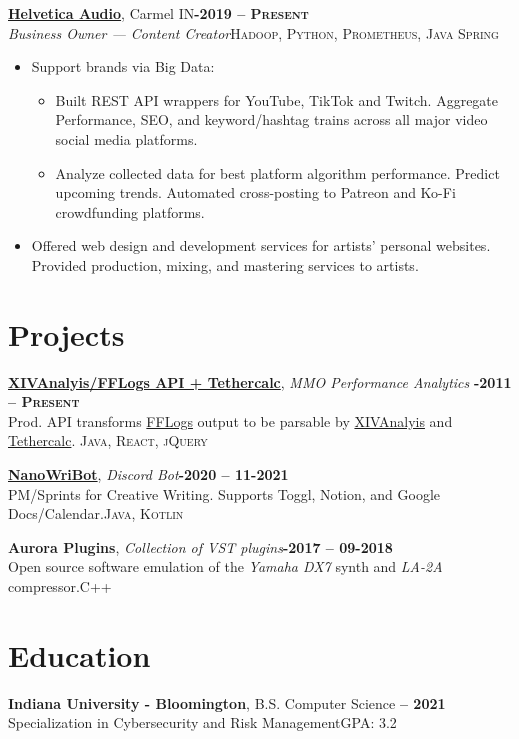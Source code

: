 \documentclass[margin,10pt]{res}
\begin{document}
\begin{resume}
    \href{}{\textbf{Helvetica Audio}}, Carmel IN\hfill \textsc{\bfseries{}-2019 -- Present}\\
    \textit{Business Owner --- Content Creator}\hfill \textsc{Hadoop, Python, Prometheus, Java Spring}
    \vspace{0.5em}
    \begin{itemize}
        \item Support brands via Big Data:
        \begin{itemize}
            \item Built REST API wrappers for YouTube, TikTok and Twitch. Aggregate Performance, SEO, and keyword/hashtag trains across all major video social media platforms. 
            \item Analyze collected data for best platform algorithm performance. Predict upcoming trends. Automated cross-posting to Patreon and Ko-Fi crowdfunding platforms. 
        \end{itemize}
        \item Offered web design and development services for artists' personal websites. Provided production, mixing, and mastering services to artists. 
    \end{itemize}
\section{\sc \lsstyle Projects}
    \href{https://tethercalc.herokuapp.com/}{\textbf{XIVAnalyis/FFLogs API + Tethercalc}}, \textit{MMO Performance Analytics} \hfill \textsc{\bfseries{}-2011 -- Present}\\
    Prod. API transforms \href{https://www.fflogs.com/}{FFLogs}  output to be parsable by \href{https://xivanalysis.com/}{XIVAnalyis}  and \href{https://tethercalc.herokuapp.com/}{Tethercalc}. \hfill \textsc{Java, React, jQuery}

    \href{https://github.com/spiffytech/DoomBot}{\textbf{NanoWriBot}}, \textit{Discord Bot}\hfill \textsc{\bfseries{}-2020 -- 11-2021}\\
    PM/Sprints for Creative Writing. Supports Toggl, Notion, and Google Docs/Calendar.\hfill \textsc{Java, Kotlin}

    \textbf{Aurora Plugins}, \textit{Collection of VST plugins}\hfill \textsc{\bfseries{}-2017 -- 09-2018}\\
    Open source software emulation of the {\em Yamaha DX7} synth and {\em LA-2A} compressor.\hfill \textsc{C++}

\section{\sc \lsstyle Education}
    \textbf{Indiana University - Bloomington}, B.S. Computer Science \hfill \textsc{\bfseries{} -- 2021}\\
    Specialization in Cybersecurity and Risk Management\hfill GPA: 3.2\\

\end{resume}
\end{document}

